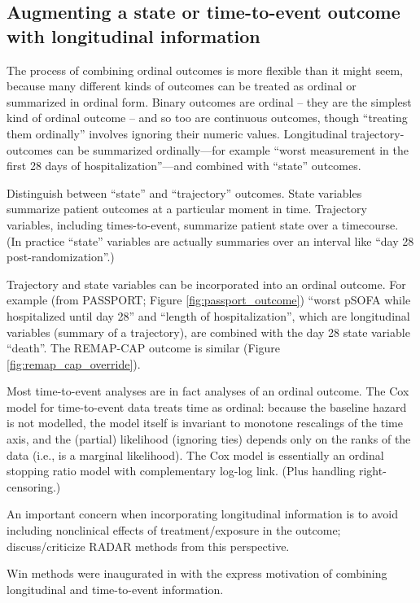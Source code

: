 \documentclass[
  11pt,
  fleqn
]{article}
\begin{document}
\subsection{Augmenting a state or time-to-event outcome with
longitudinal information}

The process of combining ordinal outcomes is more flexible than it
might seem, because many different kinds of outcomes can be treated as ordinal
or summarized in ordinal form. Binary
outcomes are ordinal -- they are the simplest kind of
ordinal outcome -- and so too are continuous outcomes, though
``treating them ordinally'' involves ignoring their numeric values.
Longitudinal trajectory-outcomes can be summarized ordinally---for
example ``worst measurement in the first 28 days of
hospitalization''---and combined with ``state'' outcomes.

Distinguish between ``state'' and ``trajectory'' outcomes. State
variables summarize patient outcomes at a particular moment in time.
Trajectory variables, including times-to-event, summarize patient
state over a timecourse. (In practice ``state'' variables are
actually summaries over an interval like ``day 28 post-randomization''.)

Trajectory and state variables can be incorporated into an
ordinal outcome. For
example (from PASSPORT; Figure \ref{fig:passport_outcome})
``worst pSOFA while
hospitalized until day 28'' and ``length of hospitalization'', which are
longitudinal variables (summary of a trajectory), are combined
with the day 28
state variable ``death''. The REMAP-CAP outcome is similar (Figure
\ref{fig:remap_cap_override}).

Most time-to-event analyses are in fact analyses of an ordinal
outcome. The Cox
model for time-to-event data treats time as ordinal: because the baseline
hazard is not modelled, the model itself is invariant to monotone
rescalings of
the time axis, and the (partial) likelihood (ignoring ties)
depends only on the
ranks of the data (i.e., is a marginal likelihood). The Cox model is
essentially an ordinal stopping ratio model with complementary log-log link.
(Plus handling right-censoring.)

An important concern when incorporating longitudinal information is
to avoid including nonclinical effects of treatment/exposure in the
outcome; \citet{ongUnlockingDOORHow2023} discuss/criticize RADAR
methods from this perspective.

Win methods were inaugurated in
\citet{finkelsteinCombiningMortalityLongitudinal1999} with the
express motivation of combining longitudinal and time-to-event information.
\end{document}
